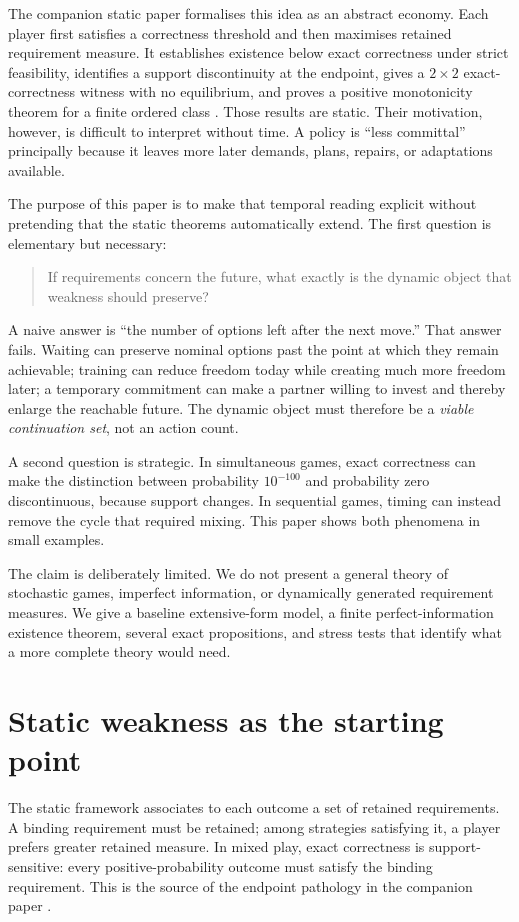 \documentclass[11pt]{article}
\theoremstyle{definition}
\begin{document}
The companion static paper formalises this idea as an abstract economy. Each player first satisfies a correctness threshold and then maximises retained requirement measure. It establishes existence below exact correctness under strict feasibility, identifies a support discontinuity at the endpoint, gives a $2\times2$ exact-correctness witness with no equilibrium, and proves a positive monotonicity theorem for a finite ordered class \cite{schulzstatic}. Those results are static. Their motivation, however, is difficult to interpret without time. A policy is ``less committal'' principally because it leaves more later demands, plans, repairs, or adaptations available.

The purpose of this paper is to make that temporal reading explicit without pretending that the static theorems automatically extend. The first question is elementary but necessary:
\begin{quote}
If requirements concern the future, what exactly is the dynamic object that weakness should preserve?
\end{quote}
A naive answer is ``the number of options left after the next move.'' That answer fails. Waiting can preserve nominal options past the point at which they remain achievable; training can reduce freedom today while creating much more freedom later; a temporary commitment can make a partner willing to invest and thereby enlarge the reachable future. The dynamic object must therefore be a \emph{viable continuation set}, not an action count.

A second question is strategic. In simultaneous games, exact correctness can make the distinction between probability $10^{-100}$ and probability zero discontinuous, because support changes. In sequential games, timing can instead remove the cycle that required mixing. This paper shows both phenomena in small examples.

The claim is deliberately limited. We do not present a general theory of stochastic games, imperfect information, or dynamically generated requirement measures. We give a baseline extensive-form model, a finite perfect-information existence theorem, several exact propositions, and stress tests that identify what a more complete theory would need.

\section{Static weakness as the starting point}

The static framework associates to each outcome a set of retained requirements. A binding requirement must be retained; among strategies satisfying it, a player prefers greater retained measure. In mixed play, exact correctness is support-sensitive: every positive-probability outcome must satisfy the binding requirement. This is the source of the endpoint pathology in the companion paper \cite{schulzstatic}.
\end{document}
